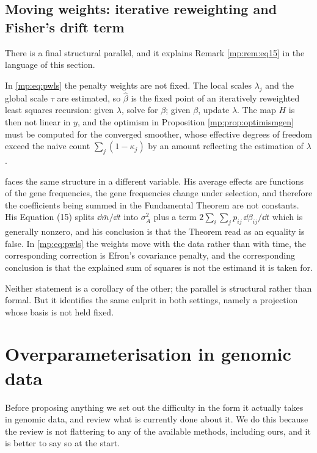 \subsection{Moving weights: iterative reweighting and Fisher's drift term}

There is a final structural parallel, and it explains Remark \ref{mp:rem:eq15} in the language of
this section.

In \eqref{mp:eq:pwls} the penalty weights are not fixed. The local scales $\lambda_j$ and the
global scale $\tau$ are estimated, so $\hat\beta$ is the fixed point of an iteratively
reweighted least squares recursion: given $\lambda$, solve for $\beta$; given $\beta$, update
$\lambda$. The map $H$ is then not linear in $y$, and the optimism in Proposition
\ref{mp:prop:optimismgen} must be computed for the converged smoother, whose effective degrees
of freedom exceed the naive count $\sum_j(1-\kappa_j)$ by an amount reflecting the estimation
of $\lambda$.

\citet{mp:ewens2024} faces the same structure in a different variable. His average effects are
functions of the gene frequencies, the gene frequencies change under selection, and therefore
the coefficients being summed in the Fundamental Theorem are not constants. His Equation (15)
splits $\dd\bar m/\dd t$ into $\sigma_A^2$ plus a term
$2\sum_i\sum_j p_{ij}\,\dd\beta_{ij}/\dd t$ which is generally nonzero, and his conclusion is
that the Theorem read as an equality is false. In \eqref{mp:eq:pwls} the weights move with the
data rather than with time, the corresponding correction is Efron's covariance penalty, and
the corresponding conclusion is that the explained sum of squares is not the estimand it is
taken for.

Neither statement is a corollary of the other; the parallel is structural rather than formal.
But it identifies the same culprit in both settings, namely a projection whose basis is not
held fixed.

\section{Overparameterisation in genomic data}
\label{mp:sec:overparam}

Before proposing anything we set out the difficulty in the form it actually takes in genomic
data, and review what is currently done about it. We do this because the review is not
flattering to any of the available methods, including ours, and it is better to say so at the
start.


